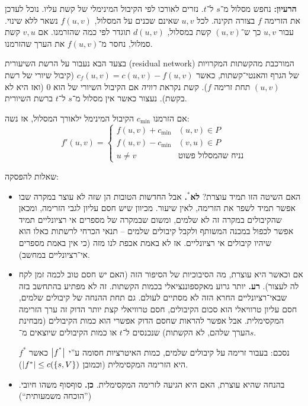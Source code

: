 \documentclass[]{../../../../tex/classes/styledArticle}
\begin{document}
	\textbf{הרעיון: }נחפש מסלול מ־$s$ ל־$t$. נזרים לאורכו לפי הקיבול המינימלי של קשת עליו. נוכל לעדכן את הזרימה $f$ בצורה תקינה. לכל $u, v$ שאינם שכנים על המסלול, $f(u, v)$ נשאר ללא שינוי. עבור $u, v$ כך ש־$(u, v)$ קשת במסלול, $d(u ,v)$ תוגדר לפי כמה שהזרמנו. אם $v, u$ קשת סמלול, נחסר מ־$f(u, v)$ את הערך שהזרמנו. 
	
	בצעד הבא נעבור על הרשת השיעורית  (residual network) המורכבת מהקשתות המקרויות של הגרף והאנטי־קשתות, כאשר $c_f(u, v) = c(u, v) - f(u, v)$ (קיבול שיורי של רשת $(u, v)$ תחת זרימה $f$). קשת נקראת \textit{רוויה} אם הקיבול השיורי של הוא $0$ (ואז היא לא בקשת). נעצור כאשר אין מסלול מ־$s$ ל־$t$ ברשת השיורית. 
	
	
	אם הזרמנו $c_{\min}$ הקיבול המינימל ילאורך המסלול, אז נשה: 
	\[ f'(u, v) =  \begin{cases}
		f(u, v) + c_{\min} & (u, v) \in P \\
		f(u, v) - c_{\min} & (v, u) \in P\\
		u \neq v & \text{נניח שהמסלול פשוט}
	\end{cases} \]
	
	
	שאלות להפסקה: 
	\begin{itemize}
		\item האם השיטה הזו תמיד עוצרת? \textbf{לא$^{\text{*}}$\!. }אבל החדשות הטובות הן שזה לא עוצר במקרה שבו אפשר תמיד לשפר את הזרימה, לאין שיעור. מכיוון שיש חסם עליון לגבי הזרימה, ומכאן שהקיבולים במקרה זה לא שלמים, ומשום שבמקרה של מספרים אי רציונליים תמיד אפשר לכפול במכנה המשותף ולקבל קיבולים שלמים – תנאי הכרחי לרשתות כאלו הוא שיהיו קיבולים אי רציונליים. אז לא באמת אכפת לנו מזה (כי אין באמת מספרים אי־רציונליים במחשב). 
		\item אם וכאשר היא עוצרת, מה הסיבוכיות של הסיפור הזה (האם יש חסם טוב לכמה זמן לקח לה לעצור). \textbf{רע. }יותר גרוע מאקספוננציאלי בכמות הקשתות. זה לא מפתיע בהתחשב בזה שבאי־רציונליים החרא הזה לא מסתיים לעולם. גם תחת ההנחה של קיבולים שלמים, חסם עליון טרוויאלי הוא סכום הקיבולים, חסם טרוויאלי קצת יותר הדוק זה ערך הזרימה המקסימלית. אבל אפשר להראות שחסם הדוק אפשרי הוא כמות הקיבולים (מבחינת הערך שלהם, לא הקשתות) שנכנסים ל־$t$ או כמות הקיבולים שיוצאים מ־$s$. 
		
		נסכם: בעבור זרימה על קיבולים שלמים, כמות האיטרציות חסומה ע''י $\left \lvert f^{^*} \right \rvert$ כאשר $f^{*}$ היא הזרימה המקסימלית (וכמובן $\left \lvert f^* \right \rvert \le c(\{s, V\})$). 
		\item בהנחה שהיא עוצרת, האם היא הגיעה לזרימה המקסימלית. \textbf{כן. }סוףסוף משהו חיובי. (''הוכחה משמעותית``)
	\end{itemize}
	
\end{document}
